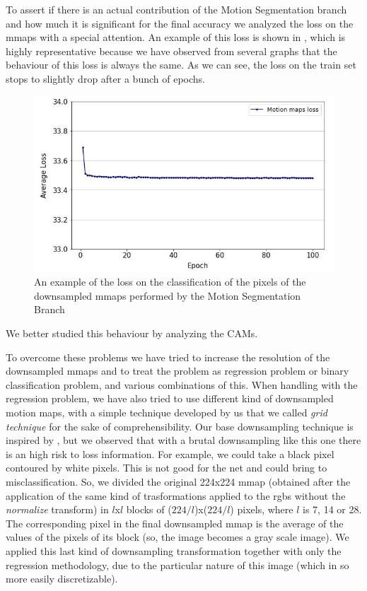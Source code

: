 \documentclass[10pt,twocolumn,hidelinks,letterpaper]{article}
\begin{document}
To assert if there is an actual contribution of the Motion Segmentation branch and how much it is significant for the final accuracy we analyzed the loss on the mmaps with a special attention. An example of this loss is shown in , which is highly representative because we have observed from several graphs that the behaviour of this loss is always the same. As we can see, the loss on the train set stops to slightly drop after a bunch of epochs.

\begin{figure}[t]
  \centering
  \includegraphics[width=\linewidth]{images/mmaps_loss.jpg}
  \caption{An example of the loss on the classification of the pixels of the downsampled mmaps performed by the Motion Segmentation Branch}
  \label{loss_mmaps}
\end{figure}

We better studied this behaviour by analyzing the CAMs.

To overcome these problems we have tried to increase the resolution of the downsampled mmaps and to treat the problem as regression problem or binary classification problem, and various combinations of this. When handling with the regression problem, we have also tried to use different kind of downsampled motion maps, with a simple technique developed by us that we called \textit{grid technique} for the sake of comprehensibility. Our base downsampling technique is inspired by \cite{downsampling}, but we observed that with a brutal downsampling like this one there is an high risk to loss information. For example, we could take a black pixel contoured by white pixels. This is not good for the net and could bring to misclassification. So, we divided the original 224x224 mmap (obtained after the application of the same kind of trasformations applied to the rgbs without the \textit{normalize} transform) in $l$x$l$ blocks of ($224/l$)x($224/l$) pixels, where $l$ is 7, 14 or 28. The corresponding pixel in the final downsampled mmap is the average of the values of the pixels of its block (so, the image becomes a gray scale image). We applied this last kind of downsampling transformation together with only the regression methodology, due to the particular nature of this image (which in so more easily discretizable).
\end{document}
